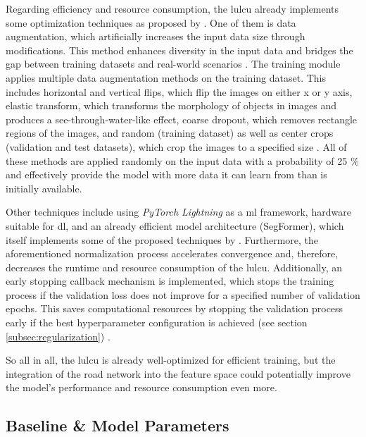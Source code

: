 Regarding efficiency and resource consumption, the \gls{lulcu} already implements some optimization techniques as proposed by \textcite{Mehlin.Schacht.ea2023}. One of them is data augmentation, which artificially increases the input data size through modifications. This method enhances diversity in the input data and bridges the gap between training datasets and real-world scenarios \autocite{Mehlin.Schacht.ea2023,Wang.Wang.ea2024}. The training module applies multiple data augmentation methods on the training dataset. This includes horizontal and vertical flips, which flip the images on either x or y axis, elastic transform, which transforms the morphology of objects in images and produces a see-through-water-like effect, coarse dropout, which removes rectangle regions of the images, and random (training dataset) as well as center crops (validation and test datasets), which crop the images to a specified size \autocite{Torchvision2024,Wang.Wang.ea2024}. All of these methods are applied randomly on the input data with a probability of 25 \% and effectively provide the model with more data it can learn from than is initially available.

Other techniques include using \emph{PyTorch Lightning} as a \gls{ml} framework, hardware suitable for \gls{dl}, and an already efficient model architecture (SegFormer), which itself implements some of the proposed techniques by \textcite{Mehlin.Schacht.ea2023}. Furthermore, the aforementioned normalization process accelerates convergence and, therefore, decreases the runtime and resource consumption of the \gls{lulcu}. Additionally, an early stopping callback mechanism is implemented, which stops the training process if the validation loss does not improve for a specified number of validation epochs. This saves computational resources by stopping the validation process early if the best hyperparameter configuration is achieved (see section \ref{subsec:regularization}) \autocite{Zhang.Lipton.ea2023}.

So all in all, the \gls{lulcu} is already well-optimized for efficient training, but the integration of the road network into the feature space could potentially improve the model's performance and resource consumption even more.

\subsection{Baseline \& Model Parameters}


